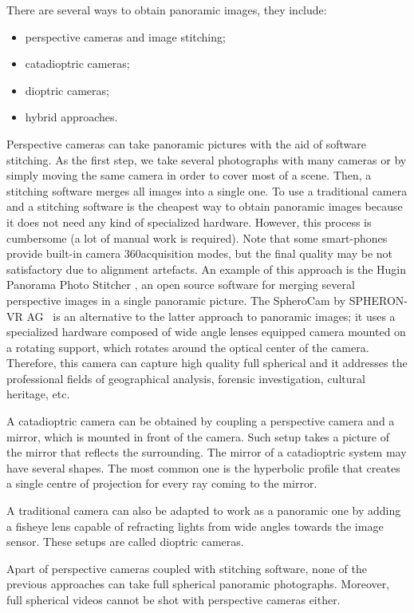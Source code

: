 There are several ways to obtain panoramic images, they include:
\begin{itemize}
	\item perspective cameras and image stitching;
	\item catadioptric cameras;
	\item dioptric cameras;
	\item hybrid approaches.
\end{itemize}

Perspective cameras can take panoramic pictures with the aid of software stitching. As the first step, we take several photographs with many cameras or by simply moving the same camera in order to cover most of a scene. Then, a stitching software merges all images into a single one. To use a traditional camera and a stitching software is the cheapest way to obtain panoramic images because it does not need any kind of specialized hardware. However, this process is cumbersome (a lot of manual work is required). Note that some smart-phones provide built-in camera 360\degree acquisition modes, but the final quality may be not satisfactory due to alignment artefacts.
An example of this approach is the Hugin Panorama Photo Stitcher 
\cite{hugin_photostitcher}, an open source software for merging several 
perspective images in a single panoramic picture.
The SpheroCam by SPHERON-VR AG~\cite{spheronvr}
is an alternative to 
the latter approach to panoramic images; it uses a specialized hardware composed
of wide angle lenses equipped camera mounted on a rotating support, which rotates around the optical center of the camera. Therefore, this camera can capture high quality full spherical and it addresses the professional fields of geographical analysis, forensic investigation, cultural heritage, etc.

A catadioptric camera can be obtained by coupling a perspective camera and a mirror, which is mounted in front of the camera. Such setup takes a picture of the mirror that reflects the surrounding. The mirror of a catadioptric system may have several shapes. The most common one is the hyperbolic profile that creates a single centre of projection for every ray coming to the mirror.

A traditional camera can also be adapted to work as a panoramic one by adding a fisheye lens capable of refracting lights from wide angles towards the image sensor. These setups are called dioptric cameras.

Apart of perspective cameras coupled with stitching software, none of the previous approaches can take full spherical panoramic photographs. Moreover, full spherical videos cannot be shot with perspective cameras either.

